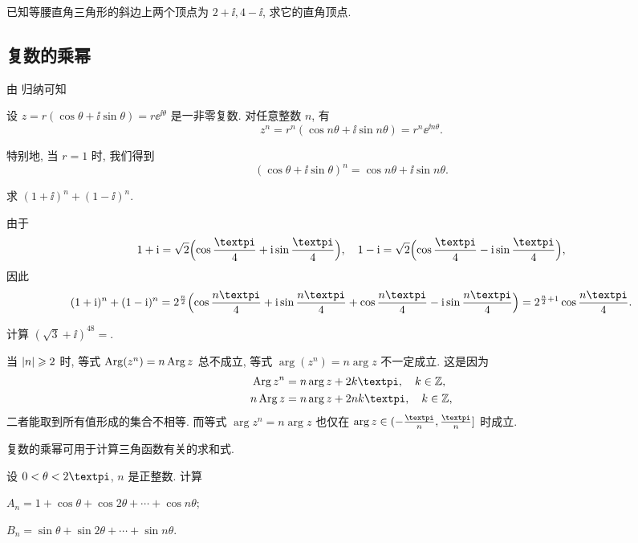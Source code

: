 \begin{exercise}
  已知等腰直角三角形的斜边上两个顶点为 $2+\ii,4-\ii$, 求它的直角顶点.
\end{exercise}


\subsection{复数的乘幂}

由 归纳可知
\begin{theorem}
  设 $z=r(\cos\theta+\ii\sin\theta)=r\ee^{\ii\theta}$ 是一非零复数.
  对任意整数 $n$, 有
  \[
    z^n=r^n(\cos{n\theta}+\ii\sin{n\theta})
    =r^n\ee^{\ii n\theta}.
  \]
\end{theorem}
特别地, 当 $r=1$ 时, 我们得到
\[
  (\cos\theta+\ii\sin\theta)^n=\cos{n\theta}+\ii\sin{n\theta}.
\]

\begin{example}
  求 $(1+\ii)^n+(1-\ii)^n$.
\end{example}

\begin{solution}
  由于
  \[
    1+\ii=\sqrt2\Bigl(\cos\frac\cpi4+\ii\sin\frac\cpi4\Bigr),\quad
    1-\ii=\sqrt2\Bigl(\cos\frac\cpi4-\ii\sin\frac\cpi4\Bigr),
  \]
  因此
  \[
     (1+\ii)^n+(1-\ii)^n
    =2^{\frac n2}\Bigl(\cos\frac{n\cpi}4+\ii\sin\frac{n\cpi}4 
      +\cos\frac{n\cpi}4-\ii\sin\frac{n\cpi}4\Bigr)
    =2^{\frac n2+1}\cos\frac{n\cpi}4.
  \]
\end{solution}

\begin{exercise}
  计算 $(\sqrt3+\ii)^{48}=$\fillblank{}.
\end{exercise}

  \alert{当 $\lvert n\rvert\geqslant 2$ 时, 等式 $\operatorname{Arg}(z^n)=n\operatorname{Arg} z$ 总不成立, 等式 $\arg(z^n)=n\arg z$ 不一定成立.} 
这是因为
\begin{align*}
  \Arg z^n&=n\arg z+2k\cpi,\quad k\in\BZ,\\
  n\Arg z&=n\arg z+2nk\cpi,\quad k\in\BZ,
\end{align*}
二者能取到所有值形成的集合不相等.
而等式 $\arg z^n=n\arg z$ 也仅在 $\arg z\in(-\frac\cpi n,\frac\cpi n]$ 时成立.

复数的乘幂可用于计算三角函数有关的求和式.

\begin{example}
  设 $0<\theta<2\cpi$, $n$ 是正整数. 计算
  \begin{subexample}
    \item $A_n=1+\cos\theta+\cos{2\theta}+\cdots+\cos{n\theta}$;
    \item $B_n=\sin\theta+\sin{2\theta}+\cdots+\sin{n\theta}$.
  \end{subexample}
\end{example}

